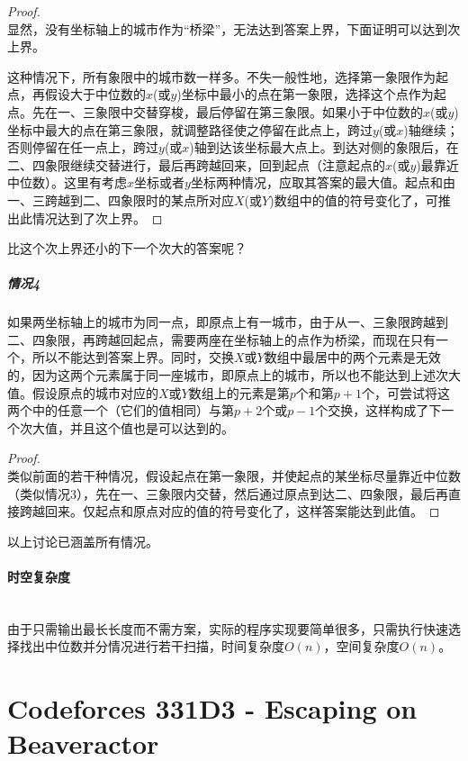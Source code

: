 \documentclass[UTF8]{ctexart}
\newcommand{\myparagraph}[1]{\paragraph{#1}\mbox{}\\}
\theoremstyle{nonumberplain}
\newtheorem{proof}{\hspace{1em}证明：}
\begin{document}
			\begin{proof}\mbox{}\\
			
				显然，没有坐标轴上的城市作为“桥梁”，无法达到答案上界，下面证明可以达到次上界。
				
				这种情况下，所有象限中的城市数一样多。不失一般性地，选择第一象限作为起点，再假设大于中位数的$x$(或$y$)坐标中最小的点在第一象限，选择这个点作为起点。先在一、三象限中交替穿梭，最后停留在第三象限。如果小于中位数的$x$(或$y$)坐标中最大的点在第三象限，就调整路径使之停留在此点上，跨过$y$(或$x$)轴继续；否则停留在任一点上，跨过$y$(或$x$)轴到达该坐标最大点上。到达对侧的象限后，在二、四象限继续交替进行，最后再跨越回来，回到起点（注意起点的$x$(或$y$)最靠近中位数）。这里有考虑$x$坐标或者$y$坐标两种情况，应取其答案的最大值。起点和由一、三跨越到二、四象限时的某点所对应$X$(或$Y$)数组中的值的符号变化了，可推出此情况达到了次上界。
			\end{proof}
			
			比这个次上界还小的下一个次大的答案呢？
			
			\subparagraph{情况4}
			如果两坐标轴上的城市为同一点，即原点上有一城市，由于从一、三象限跨越到二、四象限，再跨越回起点，需要两座在坐标轴上的点作为桥梁，而现在只有一个，所以不能达到答案上界。同时，交换$X$或$Y$数组中最居中的两个元素是无效的，因为这两个元素属于同一座城市，即原点上的城市，所以也不能达到上述次大值。假设原点的城市对应的$X$或$Y$数组上的元素是第$p$个和第$p+1$个，可尝试将这两个中的任意一个（它们的值相同）与第$p+2$个或$p-1$个交换，这样构成了下一个次大值，并且这个值也是可以达到的。
			
			\begin{proof}\mbox{}\\
			
				类似前面的若干种情况，假设起点在第一象限，并使起点的某坐标尽量靠近中位数（类似情况3），先在一、三象限内交替，然后通过原点到达二、四象限，最后再直接跨越回来。仅起点和原点对应的值的符号变化了，这样答案能达到此值。
			\end{proof}
			
			以上讨论已涵盖所有情况。
			
		\myparagraph{时空复杂度}
		
			由于只需输出最长长度而不需方案，实际的程序实现要简单很多，只需执行快速选择找出中位数并分情况进行若干扫描，时间复杂度$O(n)$，空间复杂度$O(n)$。
	
	\section{Codeforces 331D3 - Escaping on Beaveractor}
	
\end{document}
